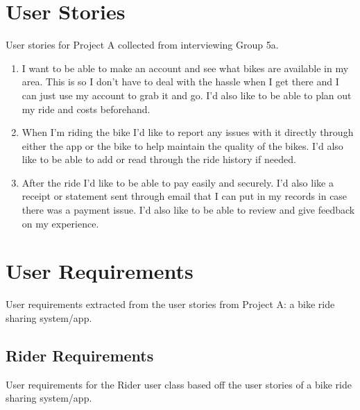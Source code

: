 \section{User Stories}
User stories for Project A collected from interviewing Group 5a.
\begin{enumerate}
    \item I want to be able to make an account and see what bikes are available in my area. This is so I don't have to deal with the hassle when I get there and I can just use my account to grab it and go. I'd also like to be able to plan out my ride and costs beforehand. 
    \item When I'm riding the bike I'd like to report any issues with it directly through either the app or the bike to help maintain the quality of the bikes. I'd also like to be able to add or read through the ride history if needed.
    \item After the ride I'd like to be able to pay easily and securely. I'd also like a receipt or statement sent through email that I can put in my records in case there was a payment issue. I'd also like to be able to review and give feedback on my experience.  
\end{enumerate}


\section{User Requirements}
User requirements extracted from the user stories from Project A: a bike ride sharing system/app. 

\subsection{Rider Requirements}
User requirements for the Rider user class based off the user stories of a bike ride sharing system/app.

